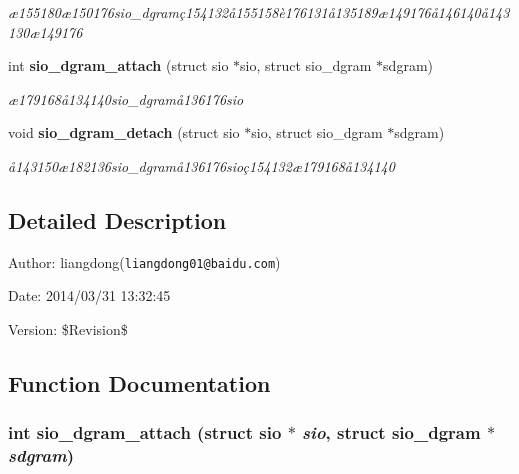 \begin{CompactItemize}
\begin{CompactList}\small\item\em \ae{}155180\ae{}150176sio\_\-dgram\c{c}154132\aa{}155158\`{e}176131\aa{}135189\ae{}149176\aa{}146140\aa{}143130\ae{}149176 \item\end{CompactList}\item 
int {\bf sio\_\-dgram\_\-attach} (struct sio $\ast$sio, struct sio\_\-dgram $\ast$sdgram)
\begin{CompactList}\small\item\em \ae{}179168\aa{}134140sio\_\-dgram\aa{}136176sio \item\end{CompactList}\item 
void {\bf sio\_\-dgram\_\-detach} (struct sio $\ast$sio, struct sio\_\-dgram $\ast$sdgram)
\begin{CompactList}\small\item\em \aa{}143150\ae{}182136sio\_\-dgram\aa{}136176sio\c{c}154132\ae{}179168\aa{}134140 \item\end{CompactList}\end{CompactItemize}


\subsection{Detailed Description}
\begin{Desc}
\item[Author:]liangdong({\tt liangdong01@baidu.com}) \end{Desc}
\begin{Desc}
\item[Date:]2014/03/31 13:32:45 \end{Desc}
\begin{Desc}
\item[Version:]\$Revision\$ \end{Desc}


\subsection{Function Documentation}
\subsubsection{\setlength{\rightskip}{0pt plus 5cm}int sio\_\-dgram\_\-attach (struct sio $\ast$ {\em sio}, struct sio\_\-dgram $\ast$ {\em sdgram})}\label{sio__dgram_8h_a6}


